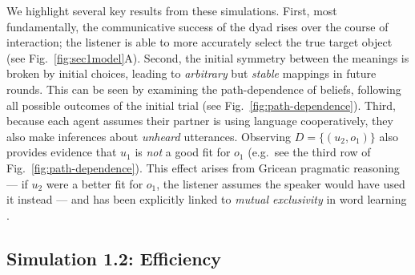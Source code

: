 We highlight several key results from these simulations.
First, most fundamentally, the communicative success of the dyad rises over the course of interaction; the listener is able to more accurately select the true target object (see Fig.~\ref{fig:sec1model}A). 
Second, the initial symmetry between the meanings is broken by initial choices, leading to \emph{arbitrary} but \emph{stable} mappings in future rounds.
This can be seen by examining the path-dependence of beliefs, following all possible outcomes of the initial trial (see Fig.~\ref{fig:path-dependence}). 
Third, because each agent assumes their partner is using language cooperatively, they also make inferences about \emph{unheard} utterances. 
Observing $D = \{(u_2, o_1)\}$ also provides evidence that $u_1$ is \emph{not} a good fit for $o_1$ (e.g.~see the third row of Fig.~\ref{fig:path-dependence}).
This effect arises from Gricean pragmatic reasoning --- if $u_2$ were a better fit for $o_1$, the listener assumes the speaker would have used it instead --- and has been explicitly linked to \emph{mutual exclusivity} in word learning \cite{FrankGoodmanTenenbaum09_Wurwur,smith_learning_2013} .

\subsection{Simulation 1.2: Efficiency}

